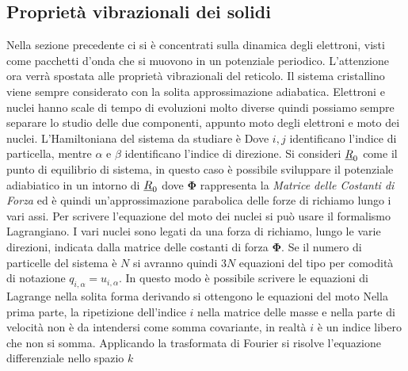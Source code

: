 \subsection{Proprietà vibrazionali dei solidi}
Nella sezione precedente ci si è concentrati sulla dinamica degli elettroni, visti come pacchetti d'onda che si muovono in un potenziale periodico. L'attenzione ora verrà spostata alle proprietà vibrazionali del reticolo. Il sistema cristallino viene sempre considerato con la solita approssimazione adiabatica. Elettroni e nuclei hanno scale di tempo di evoluzioni molto diverse quindi possiamo sempre separare lo studio delle due componenti, appunto moto degli elettroni e moto dei nuclei. L'Hamiltoniana del sistema da studiare è
Dove $i, j$ identificano l'indice di particella, mentre $\alpha$ e $\beta$ identificano l'indice di direzione.
Si consideri $\xv{R} _0$ come il punto di equilibrio di sistema, in questo caso \`e possibile sviluppare il potenziale adiabiatico in un intorno di $\xv{R} _0$ 
dove $\mathbf{\Phi}$ rappresenta la \textit{Matrice delle Costanti di Forza} ed \`e quindi un'approssimazione parabolica delle forze di richiamo lungo i vari assi. Per scrivere l'equazione del moto dei nuclei si pu\`o usare il formalismo Lagrangiano. I vari nuclei sono legati da una forza di richiamo, lungo le varie direzioni, indicata dalla matrice delle costanti di forza $\mathbf{\Phi}$. Se il numero di particelle del sistema è $N$ si avranno quindi $3N$ equazioni del tipo 
per comodità di notazione  $q_{i,\alpha} = u_{i,\alpha}$. In questo modo \`e possibile scrivere le equazioni di Lagrange nella solita forma
derivando si ottengono le equazioni del moto
Nella prima parte, la ripetizione dell'indice $i$ nella matrice delle masse e nella parte di velocità non è da intendersi come somma covariante, in realtà $i$ è un indice libero che non si somma. Applicando la trasformata di Fourier si risolve l'equazione differenziale nello spazio $k$ 
